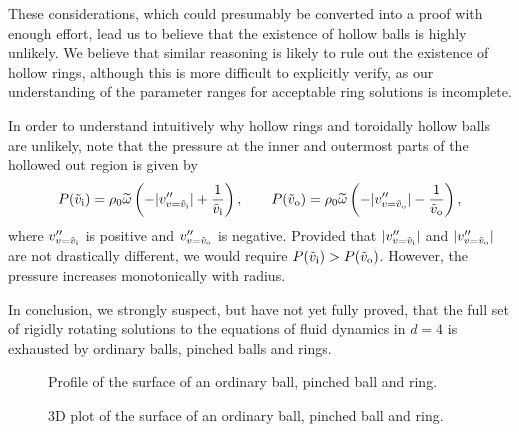 These considerations, which could presumably be converted into a proof with enough effort, 
lead us to believe that the existence of hollow balls is highly unlikely.
We believe that similar reasoning is likely to rule out the existence of hollow rings, although this is more difficult to explicitly verify, as our understanding of the parameter ranges for
acceptable ring solutions is incomplete.

In order to understand intuitively why hollow rings and toroidally hollow balls are unlikely,
note that the pressure at the inner and outermost parts of the hollowed out region is given by
%
\begin{equation*}
  P(\tilde{v}_\mathrm{i}) = \rho_0\widetilde{\omega}\left ( -|v''_{v=\tilde{v}_\mathrm{i}}|+\frac{1}{\tilde{v}_\mathrm{i}} \right ), \qquad
  P(\tilde{v}_\mathrm{o}) = \rho_0\widetilde{\omega}\left ( -|v''_{v=\tilde{v}_\mathrm{o}}|-\frac{1}{\tilde{v}_\mathrm{o}} \right ),
\end{equation*}
%
where $v''_{v=\tilde{v}_\mathrm{i}}$ is positive and $v''_{v=\tilde{v}_\mathrm{o}}$ is negative.
Provided that $|v''_{v=\tilde{v}_\mathrm{i}}|$ and $|v''_{v=\tilde{v}_\mathrm{o}}|$ are  not
drastically different, we would require $P(\tilde{v}_\mathrm{i})>P(\tilde{v}_\mathrm{o})$. However,
the pressure increases monotonically with radius.



In conclusion, we strongly suspect, but have not yet fully proved,
that the full set of rigidly rotating solutions to the equations of fluid dynamics
in $d=4$ is exhausted by ordinary balls, pinched balls and rings.


\begin{figure}
%
\begin{center}
  
  
  
  \caption{Profile of the surface of an ordinary
ball, pinched ball and ring.}\label{prof:fig}
\end{center}
%
\end{figure}

\begin{figure}
%
\begin{center}
  
  
  
  \caption{3D plot of the surface of an ordinary
ball, pinched ball and ring.}\label{surf:fig}
\end{center}
%
\end{figure}




